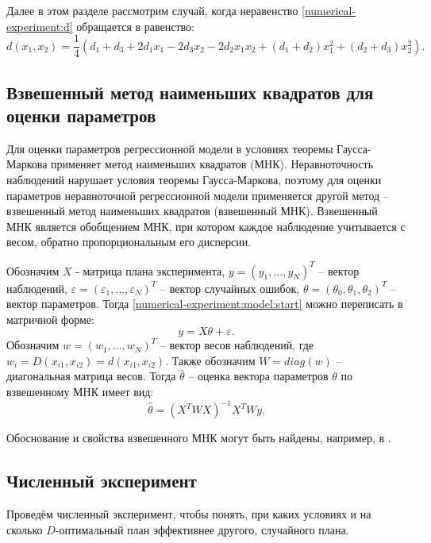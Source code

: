 Далее в этом разделе рассмотрим случай, когда неравенство \ref{numerical-experiment:d} обращается в равенство:
\begin{equation}\label{numerical-experiment:d}
d(x_1, x_2) = \frac 1 4 (d_1 + d_3 + 2 d_1 x_1 - 2 d_3 x_2 - 2d_2 x_1 x_2 + (d_1 + d_2)x_1^2 + (d_2 + d_3)x_2^2).
\end{equation}

\subsection {Взвешенный метод наименьших квадратов для оценки параметров}
Для оценки параметров регрессионной модели в условиях теоремы Гаусса-Маркова применяет метод наименьших квадратов (МНК). Неравноточность наблюдений нарушает условия теоремы Гаусса-Маркова, поэтому для оценки параметров неравноточной регрессионной модели применяется другой метод -- взвешенный метод наименьших квадратов (взвешенный МНК). Взвешенный МНК является обобщением МНК, при котором каждое наблюдение учитывается с весом, обратно пропорциональным его дисперсии. 

Обозначим $X$ - матрица плана эксперимента, $y = (y_1, ..., y_N)^T$ -- вектор наблюдений, $\varepsilon = (\varepsilon_1, ..., \varepsilon_N)^T$ -- вектор случайных ошибок, $\theta = (\theta_0, \theta_1, \theta_2)^T$ -- вектор параметров. Тогда \eqref{numerical-experiment:model:start} можно переписать в матричной форме:
\begin{equation}
y = X\theta + \varepsilon.
\end{equation}
Обозначим $w = (w_1, ..., w_N)^T$ -- вектор весов наблюдений, где $w_i = D(x_{i1}, x_{i2}) = d(x_{i1}, x_{i2})$. Также обозначим $W = diag(w)$ -- диагональная матрица весов.
Тогда $\hat \theta$ -- оценка вектора параметров $\theta$ по взвешенному МНК имеет вид:
\begin{equation}
\hat \theta = (X^T W X)^{-1} X^T W y.
\end{equation}

Обоснование и свойства взвешенного МНК могут быть найдены, например, в \cite{aivazian}.

\subsection{Численный эксперимент}
Проведём численный эксперимент, чтобы понять, при каких условиях и на сколько $D$-оптимальный план эффективнее другого, случайного плана.
